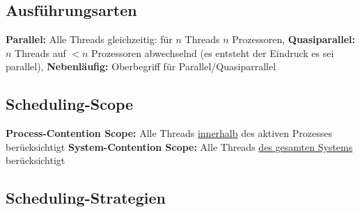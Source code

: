 \subsection{Ausführungsarten}
\textbf{Parallel:} Alle Threads gleichzeitig: für $n$ Threads $n$ Prozessoren, \textbf{Quasiparallel:} $n$ Threads auf $< n$ Prozessoren abwechselnd (es entsteht der Eindruck es sei parallel), \textbf{Nebenläufig:} Oberbegriff für Parallel/Quasiparrallel%


\subsection{Scheduling-Scope}
\textbf{Process-Contention Scope: }Alle Threads \underline{innerhalb} des aktiven Prozesses berücksichtigt
\textbf{System-Contention Scope: }Alle Threads \underline{des gesamten Systems} berücksichtigt

\subsection{Scheduling-Strategien}
